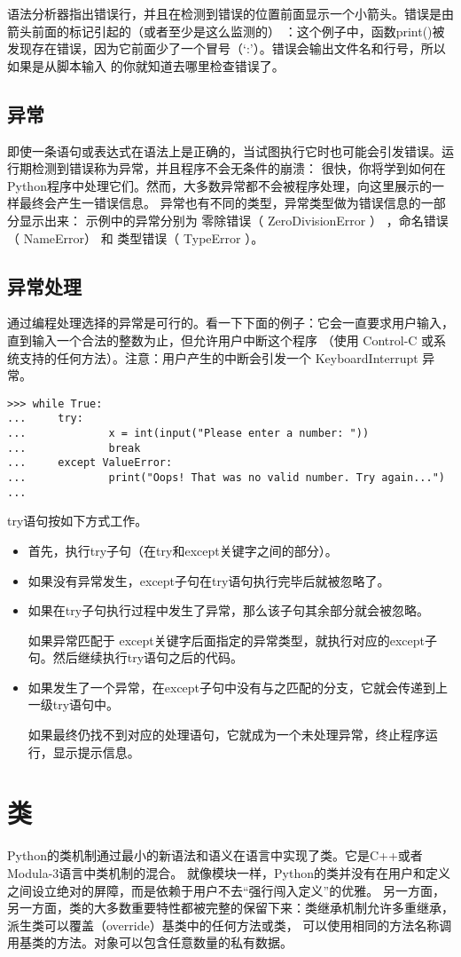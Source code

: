 \documentclass[UTF8]{ctexart}
\begin{document}
语法分析器指出错误行，并且在检测到错误的位置前面显示一个小箭头。错误是由箭头前面的标记引起的（或者至少是这么监测的）
：这个例子中，函数print()被发现存在错误，因为它前面少了一个冒号（`:'）。错误会输出文件名和行号，所以如果是从脚本输入
的你就知道去哪里检查错误了。

\subsection{异常}
即使一条语句或表达式在语法上是正确的，当试图执行它时也可能会引发错误。运行期检测到错误称为异常，并且程序不会无条件的崩溃：
很快，你将学到如何在Python程序中处理它们。然而，大多数异常都不会被程序处理，向这里展示的一样最终会产生一错误信息。
异常也有不同的类型，异常类型做为错误信息的一部分显示出来：
示例中的异常分别为 零除错误（ ZeroDivisionError ） ，命名错误（ NameError） 和 类型错误（ TypeError ）。
\subsection{异常处理}
通过编程处理选择的异常是可行的。看一下下面的例子：它会一直要求用户输入，直到输入一个合法的整数为止，但允许用户中断这个程序
（使用 Control-C 或系统支持的任何方法）。注意：用户产生的中断会引发一个 KeyboardInterrupt 异常。
\begin{verbatim}
>>> while True:
...     try:
...             x = int(input("Please enter a number: "))
...             break
...     except ValueError:
...             print("Oops! That was no valid number. Try again...")
...
\end{verbatim}

try语句按如下方式工作。
\begin{itemize}
  \item 首先，执行try子句（在try和except关键字之间的部分）。
  \item 如果没有异常发生，except子句在try语句执行完毕后就被忽略了。
  \item 如果在try子句执行过程中发生了异常，那么该子句其余部分就会被忽略。

  如果异常匹配于 except关键字后面指定的异常类型，就执行对应的except子句。然后继续执行try语句之后的代码。
  \item 如果发生了一个异常，在except子句中没有与之匹配的分支，它就会传递到上一级try语句中。

  如果最终仍找不到对应的处理语句，它就成为一个未处理异常，终止程序运行，显示提示信息。
\end{itemize}

\section{类}
Python的类机制通过最小的新语法和语义在语言中实现了类。它是C++或者Modula-3语言中类机制的混合。
就像模块一样，Python的类并没有在用户和定义之间设立绝对的屏障，而是依赖于用户不去``强行闯入定义''的优雅。
另一方面，另一方面，类的大多数重要特性都被完整的保留下来：类继承机制允许多重继承，派生类可以覆盖（override）基类中的任何方法或类，
可以使用相同的方法名称调用基类的方法。对象可以包含任意数量的私有数据。
\end{document}
